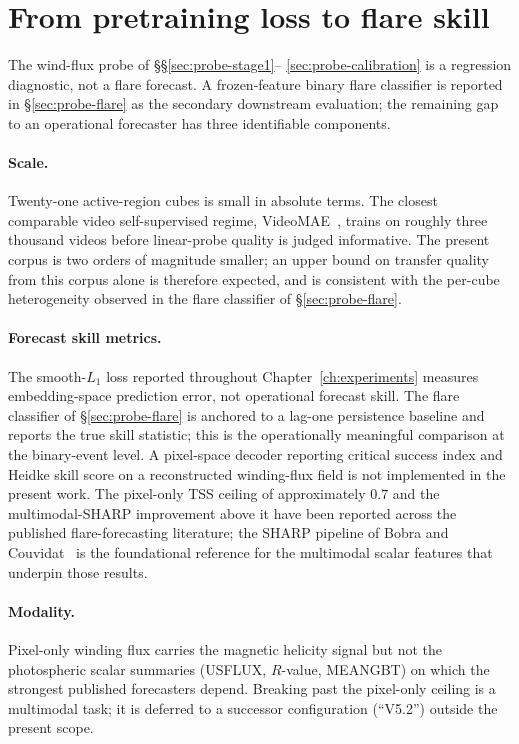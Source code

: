 \section{From pretraining loss to flare skill}
\label{sec:probe-gap}

The wind-flux probe of \S\S\ref{sec:probe-stage1}--%
\ref{sec:probe-calibration} is a regression diagnostic, not a
flare forecast. A frozen-feature binary flare classifier is
reported in \S\ref{sec:probe-flare} as the secondary downstream
evaluation; the remaining gap to an operational forecaster has
three identifiable components.

\paragraph{Scale.} Twenty-one active-region cubes is small in
absolute terms. The closest comparable video self-supervised regime,
VideoMAE~\cite{tong2022videomae}, trains on roughly three thousand
videos before linear-probe quality is judged informative. The
present corpus is two orders of magnitude smaller; an upper bound
on transfer quality from this corpus alone is therefore expected,
and is consistent with the per-cube heterogeneity observed in the
flare classifier of \S\ref{sec:probe-flare}.

\paragraph{Forecast skill metrics.} The smooth-$L_{1}$ loss reported
throughout Chapter~\ref{ch:experiments} measures embedding-space
prediction error, not operational forecast skill. The flare
classifier of \S\ref{sec:probe-flare} is anchored to a lag-one
persistence baseline and reports the true skill statistic; this is
the operationally meaningful comparison at the binary-event level.
A pixel-space decoder reporting critical success index and Heidke
skill score on a reconstructed winding-flux field is not
implemented in the present work. The pixel-only TSS ceiling of
approximately $0.7$ and the multimodal-SHARP improvement above it
have been reported across the published flare-forecasting
literature; the SHARP pipeline of
Bobra and Couvidat~\cite{bobra2014sharp} is the foundational
reference for the multimodal scalar features that underpin those
results.

\paragraph{Modality.} Pixel-only winding flux carries the magnetic
helicity signal but not the photospheric scalar summaries
(USFLUX, $R$-value, MEANGBT) on which the strongest published
forecasters depend. Breaking past the pixel-only ceiling is a
multimodal task; it is deferred to a successor configuration
(``V5.2'') outside the present scope.

